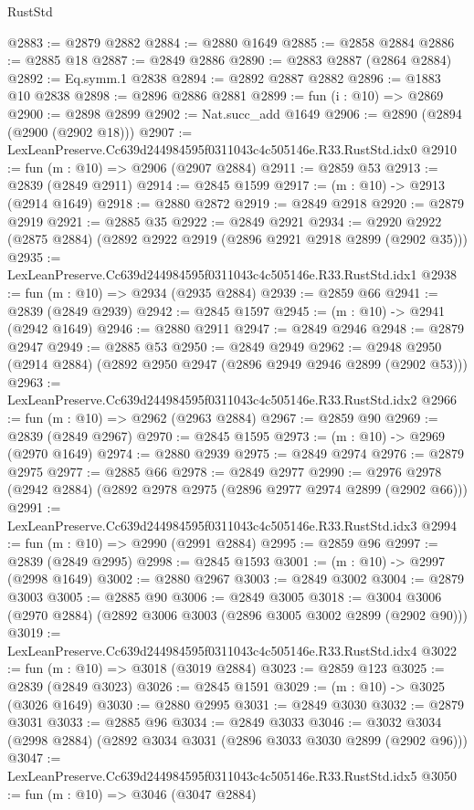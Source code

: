 \begin{lexlean}{RustStd}
\begin{coremodule}
@2883 := @2879 @2882
@2884 := @2880 @1649
@2885 := @2858 @2884
@2886 := @2885 @18
@2887 := @2849 @2886
@2890 := @2883 @2887 (@2864 @2884)
@2892 := Eq.symm.{1} @2838
@2894 := @2892 @2887 @2882
@2896 := @1883 @10 @2838
@2898 := @2896 @2886 @2881
@2899 := fun (i : @10) => @2869
@2900 := @2898 @2899
@2902 := Nat.succ_add @1649
@2906 := @2890 (@2894 (@2900 (@2902 @18)))
@2907 := LexLeanPreserve.Cc639d244984595f0311043c4c505146e.R33.RustStd.idx0
@2910 := fun (m : @10) => @2906 (@2907 @2884)
@2911 := @2859 @53
@2913 := @2839 (@2849 @2911)
@2914 := @2845 @1599
@2917 := (m : @10) -> @2913 (@2914 @1649)
@2918 := @2880 @2872
@2919 := @2849 @2918
@2920 := @2879 @2919
@2921 := @2885 @35
@2922 := @2849 @2921
@2934 := @2920 @2922 (@2875 @2884) (@2892 @2922 @2919 (@2896 @2921 @2918 @2899 (@2902 @35)))
@2935 := LexLeanPreserve.Cc639d244984595f0311043c4c505146e.R33.RustStd.idx1
@2938 := fun (m : @10) => @2934 (@2935 @2884)
@2939 := @2859 @66
@2941 := @2839 (@2849 @2939)
@2942 := @2845 @1597
@2945 := (m : @10) -> @2941 (@2942 @1649)
@2946 := @2880 @2911
@2947 := @2849 @2946
@2948 := @2879 @2947
@2949 := @2885 @53
@2950 := @2849 @2949
@2962 := @2948 @2950 (@2914 @2884) (@2892 @2950 @2947 (@2896 @2949 @2946 @2899 (@2902 @53)))
@2963 := LexLeanPreserve.Cc639d244984595f0311043c4c505146e.R33.RustStd.idx2
@2966 := fun (m : @10) => @2962 (@2963 @2884)
@2967 := @2859 @90
@2969 := @2839 (@2849 @2967)
@2970 := @2845 @1595
@2973 := (m : @10) -> @2969 (@2970 @1649)
@2974 := @2880 @2939
@2975 := @2849 @2974
@2976 := @2879 @2975
@2977 := @2885 @66
@2978 := @2849 @2977
@2990 := @2976 @2978 (@2942 @2884) (@2892 @2978 @2975 (@2896 @2977 @2974 @2899 (@2902 @66)))
@2991 := LexLeanPreserve.Cc639d244984595f0311043c4c505146e.R33.RustStd.idx3
@2994 := fun (m : @10) => @2990 (@2991 @2884)
@2995 := @2859 @96
@2997 := @2839 (@2849 @2995)
@2998 := @2845 @1593
@3001 := (m : @10) -> @2997 (@2998 @1649)
@3002 := @2880 @2967
@3003 := @2849 @3002
@3004 := @2879 @3003
@3005 := @2885 @90
@3006 := @2849 @3005
@3018 := @3004 @3006 (@2970 @2884) (@2892 @3006 @3003 (@2896 @3005 @3002 @2899 (@2902 @90)))
@3019 := LexLeanPreserve.Cc639d244984595f0311043c4c505146e.R33.RustStd.idx4
@3022 := fun (m : @10) => @3018 (@3019 @2884)
@3023 := @2859 @123
@3025 := @2839 (@2849 @3023)
@3026 := @2845 @1591
@3029 := (m : @10) -> @3025 (@3026 @1649)
@3030 := @2880 @2995
@3031 := @2849 @3030
@3032 := @2879 @3031
@3033 := @2885 @96
@3034 := @2849 @3033
@3046 := @3032 @3034 (@2998 @2884) (@2892 @3034 @3031 (@2896 @3033 @3030 @2899 (@2902 @96)))
@3047 := LexLeanPreserve.Cc639d244984595f0311043c4c505146e.R33.RustStd.idx5
@3050 := fun (m : @10) => @3046 (@3047 @2884)

\end{coremodule}
\end{lexlean}
